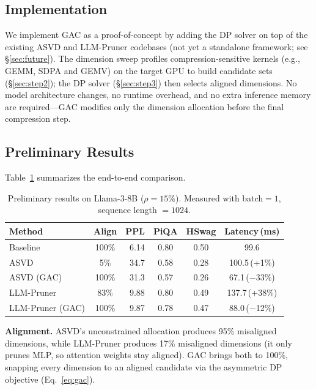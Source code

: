 \documentclass[sigplan,10pt]{acmart}
\begin{document}
\subsection{Implementation}

We implement GAC as a proof-of-concept by adding the DP solver on top of the existing ASVD and LLM-Pruner codebases (not yet a standalone framework; see \S\ref{sec:future}).
The dimension sweep profiles compression-sensitive kernels (e.g., GEMM, SDPA and GEMV) on the target GPU to build candidate sets (\S\ref{sec:step2}); the DP solver (\S\ref{sec:step3}) then selects aligned dimensions.
No model architecture changes, no runtime overhead, and no extra inference memory are required---GAC modifies only the dimension allocation before the final compression step.

\subsection{Preliminary Results}

Table~\ref{tab:main_results} summarizes the end-to-end comparison.

\begin{table}[t]
\centering
\caption{Preliminary results on Llama-3-8B ($\rho{=}15\%$). Measured with batch${=}1$, sequence length ${=}1024$.}
\label{tab:main_results}
\small
\setlength{\tabcolsep}{3pt}
\begin{tabular}{@{}lcrccc@{}}
\toprule
\textbf{Method} & \textbf{Align} & \textbf{PPL} & \textbf{PiQA} & \textbf{HSwag} & \textbf{Latency\,(ms)} \\
\midrule
\rowcolor{gray!10} Baseline & 100\% & 6.14 & 0.80 & 0.50 & 99.6 \\
\midrule
ASVD & 5\% & 34.7 & 0.58 & 0.28 & 100.5\,{\scriptsize\textcolor{cred}{(+1\%)}} \\
ASVD (GAC) & 100\% & 31.3 & 0.57 & 0.26 & 67.1\,{\scriptsize\textcolor{cgreen}{($-$33\%)}} \\
\midrule
LLM-Pruner & 83\% & 9.88 & 0.80 & 0.49 & 137.7\,{\scriptsize\textcolor{cred}{(+38\%)}} \\
LLM-Pruner (GAC) & 100\% & 9.87 & 0.78 & 0.47 & 88.0\,{\scriptsize\textcolor{cgreen}{($-$12\%)}} \\
\bottomrule
\end{tabular}
\end{table}

\noindent \textbf{Alignment.}
ASVD's unconstrained allocation produces 95\% misaligned dimensions, while LLM-Pruner produces 17\% misaligned dimensions (it only prunes MLP, so attention weights stay aligned).
GAC brings both to 100\%, snapping every dimension to an aligned candidate via the asymmetric DP objective (Eq.~\ref{eq:gac}).
\end{document}
